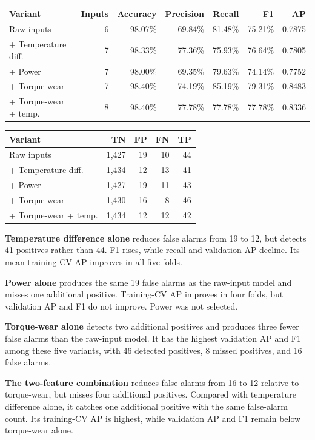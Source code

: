 \documentclass[11pt,a4paper]{article}
\begin{document}
\begin{center}
{\small
\begin{tabular}{lrrrrrr}
\toprule
Variant & Inputs & Accuracy & Precision & Recall & F1 & AP \\
\midrule
Raw inputs & 6 & 98.07\% & 69.84\% & 81.48\% & 75.21\% & 0.7875 \\
+ Temperature diff. & 7 & 98.33\% & 77.36\% & 75.93\% & 76.64\% & 0.7805 \\
+ Power & 7 & 98.00\% & 69.35\% & 79.63\% & 74.14\% & 0.7752 \\
+ Torque-wear & 7 & 98.40\% & 74.19\% & 85.19\% & 79.31\% & 0.8483 \\
+ Torque-wear + temp. & 8 & 98.40\% & 77.78\% & 77.78\% & 77.78\% & 0.8336 \\
\bottomrule
\end{tabular}}
\end{center}

\begin{center}
\begin{tabular}{lrrrr}
\toprule
Variant & TN & FP & FN & TP \\
\midrule
Raw inputs & 1,427 & 19 & 10 & 44 \\
+ Temperature diff. & 1,434 & 12 & 13 & 41 \\
+ Power & 1,427 & 19 & 11 & 43 \\
+ Torque-wear & 1,430 & 16 & 8 & 46 \\
+ Torque-wear + temp. & 1,434 & 12 & 12 & 42 \\
\bottomrule
\end{tabular}
\end{center}

\textbf{Temperature difference alone} reduces false alarms from 19 to 12,
but detects 41 positives rather than 44. F1 rises, while recall and validation
AP decline. Its mean training-CV AP improves in all five folds.

\textbf{Power alone} produces the same 19 false alarms as the raw-input model
and misses one additional positive. Training-CV AP improves in four folds,
but validation AP and F1 do not improve. Power was not selected.

\textbf{Torque-wear alone} detects two additional positives and produces
three fewer false alarms than the raw-input model. It has the highest
validation AP and F1 among these five variants, with 46 detected positives,
8 missed positives, and 16 false alarms.

\textbf{The two-feature combination} reduces false alarms from 16 to 12
relative to torque-wear, but misses four additional positives. Compared
with temperature difference alone, it catches one additional positive with
the same false-alarm count. Its training-CV AP is highest, while validation
AP and F1 remain below torque-wear alone.
\end{document}
